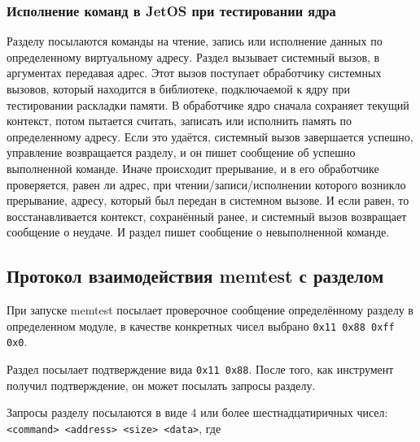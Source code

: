 \documentclass[oneside,senior,etd]{BYUPhys}
\begin{document}
\subsubsection{Исполнение команд в JetOS при тестировании ядра}

Разделу посылаются команды на чтение, запись или исполнение данных по определенному виртуальному адресу.
Раздел вызывает системный вызов, в аргументах передавая адрес. Этот вызов поступает
обработчику системных вызовов, который находится в библиотеке, подключаемой к ядру
при тестировании раскладки памяти. В обработчике ядро сначала сохраняет текущий контекст,
потом пытается считать, записать или
исполнить память по определенному адресу. Если это удаётся, системный вызов завершается
успешно, управление возвращается разделу, и он пишет сообщение об успешно выполненной
команде. Иначе происходит прерывание, и в его обработчике проверяется, равен ли адрес,
при чтении/записи/исполнении которого возникло прерывание, адресу, который был передан
в системном вызове. И если равен, то восстанавливается контекст, сохранённый ранее, и 
системный вызов возвращает сообщение о неудаче. И раздел пишет сообщение о невыполненной
команде.


\subsection{Протокол взаимодействия memtest с разделом}

При запуске memtest посылает проверочное сообщение определённому разделу в определенном модуле, в
качестве конкретных чисел выбрано \dq\texttt{0x11 0x88 0xff 0x0}\dq.

Раздел посылает подтверждение вида \dq\texttt{0x11 0x88}\dq. После того, как инструмент получил подтверждение, 
он может посылать запросы разделу.

Запросы разделу посылаются в виде 4 или более шестнадцатиричных чисел:
\dq\texttt{<command> <address> <size> <data>}\dq, где
\end{document}
